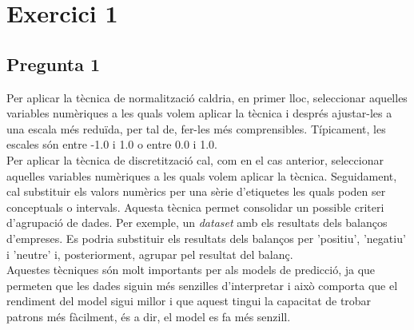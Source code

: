 \documentclass[a4paper,12pt]{report}
\begin{document}
\thispagestyle{empty}
	\begin{titlepage}
		\maketitle
		\thispagestyle{empty}
	\end{titlepage}
	\cleardoublepage
	\newpage

\thispagestyle{empty}
\tableofcontents
\thispagestyle{empty}
\listoffigures
\thispagestyle{empty}
\newpage
{}
\section*{Exercici 1}
\subsection*{Pregunta 1}
Per aplicar la tècnica de normalització caldria, en primer lloc, seleccionar aquelles variables numèriques a les quals volem aplicar la tècnica i després ajustar-les a una escala més reduïda, per tal de, fer-les més comprensibles. Típicament, les escales són entre -1.0 i 1.0 o entre 0.0 i 1.0.\\
Per aplicar la tècnica de discretització cal, com en el cas anterior, seleccionar aquelles variables numèriques a les quals volem aplicar la tècnica. Seguidament, cal substituir els valors numèrics per una sèrie d'etiquetes les quals poden ser conceptuals o intervals. Aquesta tècnica permet consolidar un possible criteri d'agrupació de dades. Per exemple, un \textit{dataset} amb els resultats dels balanços d'empreses. Es podria substituir els resultats dels balanços per 'positiu', 'negatiu' i 'neutre' i, posteriorment, agrupar pel resultat del balanç.\\
Aquestes tècniques són molt importants per als models de predicció, ja que permeten que les dades siguin més senzilles d'interpretar i això comporta que el rendiment del model sigui millor i que aquest tingui la capacitat de trobar patrons més fàcilment, és a dir, el model es fa més senzill.
\end{document}
